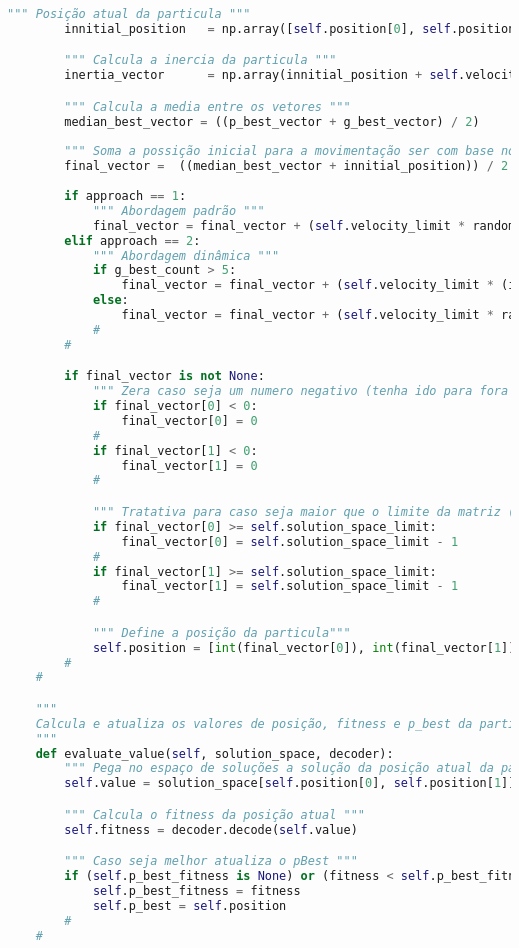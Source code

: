 \begin{lstlisting}[language=Python, caption=Classe de Particula]
        """ Posição atual da particula """
        innitial_position   = np.array([self.position[0], self.position[1]])

        """ Calcula a inercia da particula """
        inertia_vector      = np.array(innitial_position + self.velocity)

        """ Calcula a media entre os vetores """
        median_best_vector = ((p_best_vector + g_best_vector) / 2)
        
        """ Soma a possição inicial para a movimentação ser com base no na posição atual """
        final_vector =  ((median_best_vector + innitial_position)) / 2
        
        if approach == 1:
            """ Abordagem padrão """
            final_vector = final_vector + (self.velocity_limit * random.random())
        elif approach == 2:
            """ Abordagem dinâmica """
            if g_best_count > 5:
                final_vector = final_vector + (self.velocity_limit * (inertia_vector * random.random()))
            else:
                final_vector = final_vector + (self.velocity_limit * random.random())
            #
        #

        if final_vector is not None:
            """ Zera caso seja um numero negativo (tenha ido para fora do mapa) """
            if final_vector[0] < 0:
                final_vector[0] = 0
            #
            if final_vector[1] < 0:
                final_vector[1] = 0
            #

            """ Tratativa para caso seja maior que o limite da matriz (tenha ido para fora do mapa) """
            if final_vector[0] >= self.solution_space_limit:
                final_vector[0] = self.solution_space_limit - 1
            #
            if final_vector[1] >= self.solution_space_limit:
                final_vector[1] = self.solution_space_limit - 1
            #

            """ Define a posição da particula"""
            self.position = [int(final_vector[0]), int(final_vector[1])]
        #
    #

    """
    Calcula e atualiza os valores de posição, fitness e p_best da particula 
    """
    def evaluate_value(self, solution_space, decoder):
        """ Pega no espaço de soluções a solução da posição atual da particula """
        self.value = solution_space[self.position[0], self.position[1]]

        """ Calcula o fitness da posição atual """
        self.fitness = decoder.decode(self.value)

        """ Caso seja melhor atualiza o pBest """
        if (self.p_best_fitness is None) or (fitness < self.p_best_fitness):
            self.p_best_fitness = fitness
            self.p_best = self.position
        #
    #

\end{lstlisting}